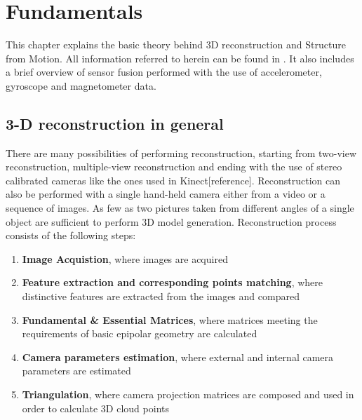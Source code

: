 
\chapter{Fundamentals} %
This chapter explains the basic theory behind 3D reconstruction and Structure from Motion. All information referred to herein can be found in \cite{HartleyMultipleView}. It also includes a brief overview of sensor fusion performed with the use of accelerometer, gyroscope and magnetometer data. 

\section{3-D reconstruction in general}
There are many possibilities of performing reconstruction, starting from two-view reconstruction, multiple-view reconstruction and ending with the use of stereo calibrated cameras like the ones used in Kinect[reference]. Reconstruction can also be performed with a single hand-held camera either from a video or a sequence of images. As few as two pictures taken from different angles of a single object are sufficient to perform 3D model generation. Reconstruction process consists of the following steps:
\begin{enumerate}
\item \textbf{Image Acquistion}, where images are acquired 
\item \textbf{Feature extraction and corresponding points matching}, where distinctive features are extracted from the images and compared
\item \textbf{Fundamental \& Essential Matrices}, where matrices meeting the requirements of basic epipolar geometry are calculated
\item \textbf{Camera parameters estimation}, where external and internal camera parameters are estimated
\item \textbf{Triangulation}, where camera projection matrices are composed and used in order to calculate 3D cloud points
\end{enumerate}
